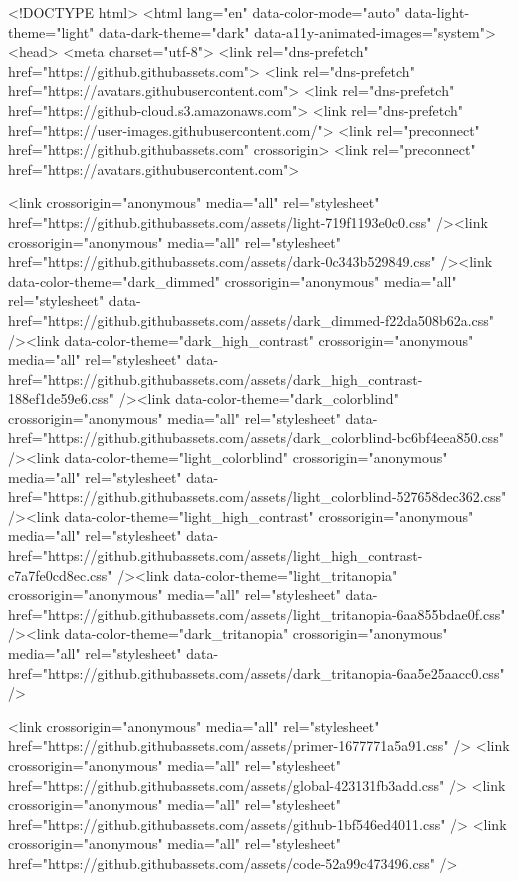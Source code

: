 






<!DOCTYPE html>
<html lang="en" data-color-mode="auto" data-light-theme="light" data-dark-theme="dark" data-a11y-animated-images="system">
  <head>
    <meta charset="utf-8">
  <link rel="dns-prefetch" href="https://github.githubassets.com">
  <link rel="dns-prefetch" href="https://avatars.githubusercontent.com">
  <link rel="dns-prefetch" href="https://github-cloud.s3.amazonaws.com">
  <link rel="dns-prefetch" href="https://user-images.githubusercontent.com/">
  <link rel="preconnect" href="https://github.githubassets.com" crossorigin>
  <link rel="preconnect" href="https://avatars.githubusercontent.com">

  <link crossorigin="anonymous" media="all" rel="stylesheet" href="https://github.githubassets.com/assets/light-719f1193e0c0.css" /><link crossorigin="anonymous" media="all" rel="stylesheet" href="https://github.githubassets.com/assets/dark-0c343b529849.css" /><link data-color-theme="dark_dimmed" crossorigin="anonymous" media="all" rel="stylesheet" data-href="https://github.githubassets.com/assets/dark_dimmed-f22da508b62a.css" /><link data-color-theme="dark_high_contrast" crossorigin="anonymous" media="all" rel="stylesheet" data-href="https://github.githubassets.com/assets/dark_high_contrast-188ef1de59e6.css" /><link data-color-theme="dark_colorblind" crossorigin="anonymous" media="all" rel="stylesheet" data-href="https://github.githubassets.com/assets/dark_colorblind-bc6bf4eea850.css" /><link data-color-theme="light_colorblind" crossorigin="anonymous" media="all" rel="stylesheet" data-href="https://github.githubassets.com/assets/light_colorblind-527658dec362.css" /><link data-color-theme="light_high_contrast" crossorigin="anonymous" media="all" rel="stylesheet" data-href="https://github.githubassets.com/assets/light_high_contrast-c7a7fe0cd8ec.css" /><link data-color-theme="light_tritanopia" crossorigin="anonymous" media="all" rel="stylesheet" data-href="https://github.githubassets.com/assets/light_tritanopia-6aa855bdae0f.css" /><link data-color-theme="dark_tritanopia" crossorigin="anonymous" media="all" rel="stylesheet" data-href="https://github.githubassets.com/assets/dark_tritanopia-6aa5e25aacc0.css" />
  
  
    <link crossorigin="anonymous" media="all" rel="stylesheet" href="https://github.githubassets.com/assets/primer-1677771a5a91.css" />
    <link crossorigin="anonymous" media="all" rel="stylesheet" href="https://github.githubassets.com/assets/global-423131fb3add.css" />
    <link crossorigin="anonymous" media="all" rel="stylesheet" href="https://github.githubassets.com/assets/github-1bf546ed4011.css" />
  <link crossorigin="anonymous" media="all" rel="stylesheet" href="https://github.githubassets.com/assets/code-52a99c473496.css" />

